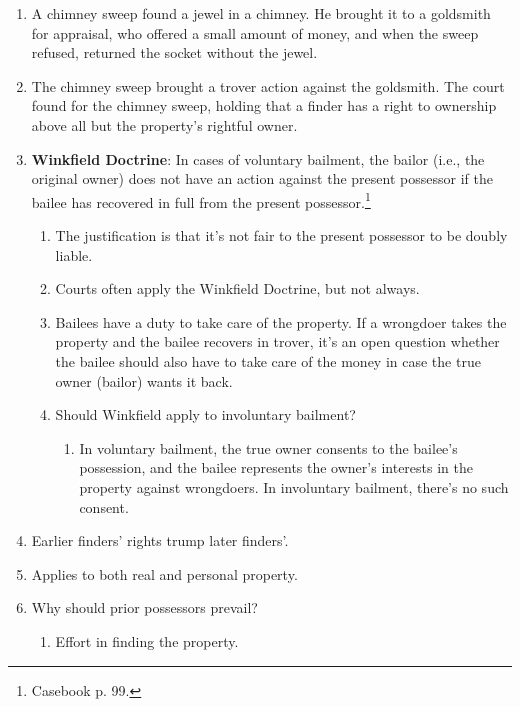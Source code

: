 \begin{enumerate}
    \item A chimney sweep found a jewel in a chimney. He brought it to a 
    goldsmith for appraisal, who offered a small amount of money, and when the 
    sweep refused, returned the socket without the jewel.
    \item The chimney sweep brought a trover action against the goldsmith. The 
    court found for the chimney sweep, holding that a finder has a right to 
    ownership above all but the property's rightful owner.
    \item \textbf{Winkfield Doctrine}: In cases of voluntary bailment, the 
    bailor (i.e., the original owner) does not have an action against the 
    present possessor if the bailee has recovered in full from the present 
    possessor.\footnote{Casebook p. 99.}
    \begin{enumerate}
        \item The justification is that it's not fair to the present 
        possessor to be doubly liable.
        \item Courts often apply the Winkfield Doctrine, but not always.
        \item Bailees have a duty to take care of the property. If a wrongdoer 
        takes the property and the bailee recovers in trover, it's an open 
        question whether the bailee should also have to take care of the money 
        in case the true owner (bailor) wants it back.
        \item Should Winkfield apply to involuntary bailment?
        \begin{enumerate}
            \item In voluntary bailment, the true owner consents to the 
            bailee's possession, and the bailee represents the owner's 
            interests in the property against wrongdoers. In involuntary 
            bailment, there's no such consent.
        \end{enumerate}
    \end{enumerate}
    \item Earlier finders' rights trump later finders'.
    \item Applies to both real and personal property.
    \item Why should prior possessors prevail?
    \begin{enumerate}
        \item Effort in finding the property.

\end{enumerate}
\end{enumerate}
